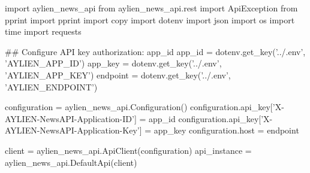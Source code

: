 
\begin{pyin}
import aylien_news_api
from aylien_news_api.rest import ApiException
from pprint import pprint
import copy
import dotenv
import json
import os
import time
import requests
\end{pyin}

\begin{pyin}
\## Configure API key authorization: app_id
app_id = dotenv.get_key('../.env', 'AYLIEN_APP_ID')
app_key = dotenv.get_key('../.env', 'AYLIEN_APP_KEY')
endpoint = dotenv.get_key('../.env', 'AYLIEN_ENDPOINT')

configuration = aylien_news_api.Configuration()
configuration.api_key['X-AYLIEN-NewsAPI-Application-ID'] = app_id
configuration.api_key['X-AYLIEN-NewsAPI-Application-Key'] = app_key
configuration.host = endpoint
\end{pyin}

\begin{pyin}
client = aylien_news_api.ApiClient(configuration)
api_instance = aylien_news_api.DefaultApi(client)
\end{pyin}

